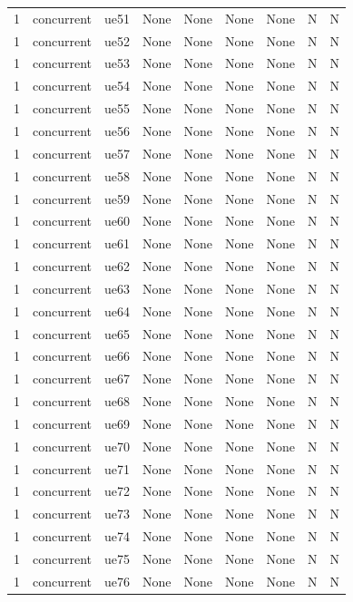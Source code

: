\begin{table}[ht]
\begin{tabular}{|c|c|c|c|c|c|c|c|c|}
1 & concurrent & ue51 & None & None & None & None & N & N \\
1 & concurrent & ue52 & None & None & None & None & N & N \\
1 & concurrent & ue53 & None & None & None & None & N & N \\
1 & concurrent & ue54 & None & None & None & None & N & N \\
1 & concurrent & ue55 & None & None & None & None & N & N \\
1 & concurrent & ue56 & None & None & None & None & N & N \\
1 & concurrent & ue57 & None & None & None & None & N & N \\
1 & concurrent & ue58 & None & None & None & None & N & N \\
1 & concurrent & ue59 & None & None & None & None & N & N \\
1 & concurrent & ue60 & None & None & None & None & N & N \\
1 & concurrent & ue61 & None & None & None & None & N & N \\
1 & concurrent & ue62 & None & None & None & None & N & N \\
1 & concurrent & ue63 & None & None & None & None & N & N \\
1 & concurrent & ue64 & None & None & None & None & N & N \\
1 & concurrent & ue65 & None & None & None & None & N & N \\
1 & concurrent & ue66 & None & None & None & None & N & N \\
1 & concurrent & ue67 & None & None & None & None & N & N \\
1 & concurrent & ue68 & None & None & None & None & N & N \\
1 & concurrent & ue69 & None & None & None & None & N & N \\
1 & concurrent & ue70 & None & None & None & None & N & N \\
1 & concurrent & ue71 & None & None & None & None & N & N \\
1 & concurrent & ue72 & None & None & None & None & N & N \\
1 & concurrent & ue73 & None & None & None & None & N & N \\
1 & concurrent & ue74 & None & None & None & None & N & N \\
1 & concurrent & ue75 & None & None & None & None & N & N \\
1 & concurrent & ue76 & None & None & None & None & N & N \\

\end{tabular}
\end{table}
